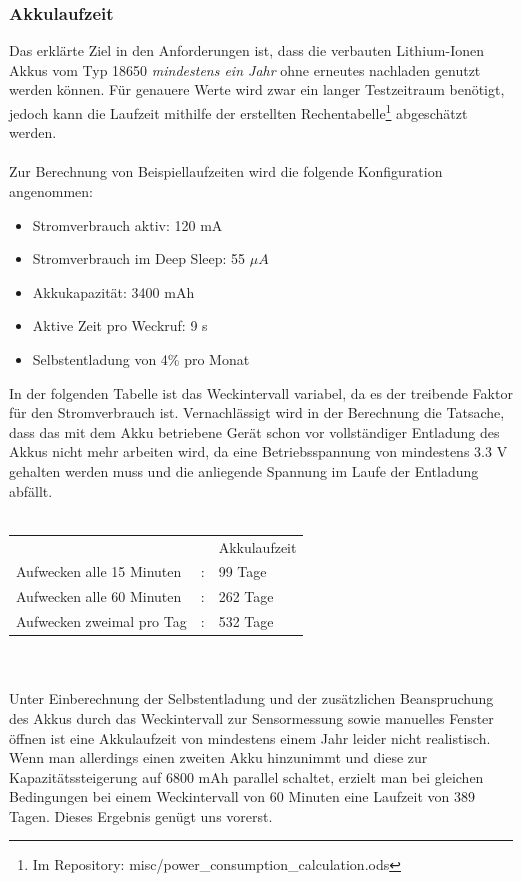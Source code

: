\documentclass[a4paper,10pt,twocolumn]{article}
\begin{document}
\subsubsection{Akkulaufzeit}
Das erklärte Ziel in den Anforderungen ist, dass die verbauten Lithium-Ionen Akkus vom Typ 18650 \textit{mindestens ein Jahr} ohne erneutes nachladen genutzt werden können. Für genauere Werte wird zwar ein langer Testzeitraum benötigt, jedoch kann die Laufzeit mithilfe der erstellten Rechentabelle\footnote{Im Repository\cite{smarthome2}: \mbox{misc/power\_consumption\_calculation.ods}} abgeschätzt werden.\\\\
Zur Berechnung von Beispiellaufzeiten wird die folgende Konfiguration angenommen:
\begin{itemize}[noitemsep]
    \item Stromverbrauch aktiv: 120 mA
    \item Stromverbrauch im Deep Sleep: 55 $\mu A$
    \item Akkukapazität: 3400 mAh
    \item Aktive Zeit pro Weckruf: 9 s
    \item Selbstentladung von 4\% pro Monat \cite[S. 20]{umweltbundesamt}
\end{itemize}
In der folgenden Tabelle ist das Weckintervall variabel, da es der treibende Faktor für den Stromverbrauch ist. Vernachlässigt wird in der Berechnung die Tatsache, dass das mit dem Akku betriebene Gerät schon vor vollständiger Entladung des Akkus nicht mehr arbeiten wird, da eine Betriebsspannung von mindestens 3.3 V gehalten werden muss und die anliegende Spannung im Laufe der Entladung abfällt.\\\\
\begin{tabularx}{\textwidth/2}{lcX}
& & Akkulaufzeit\\
Aufwecken alle 15 Minuten & : & 99 Tage\\
Aufwecken alle 60 Minuten & : & 262 Tage\\
Aufwecken zweimal pro Tag & : & 532 Tage\\
\end{tabularx}\\\\
Unter Einberechnung der Selbstentladung und der zusätzlichen Beanspruchung des Akkus durch das Weckintervall zur Sensormessung sowie manuelles Fenster öffnen ist eine Akkulaufzeit von mindestens einem Jahr leider nicht realistisch. Wenn man allerdings einen zweiten Akku hinzunimmt und diese zur Kapazitätssteigerung auf 6800 mAh parallel schaltet, erzielt man bei gleichen Bedingungen bei einem Weckintervall von 60 Minuten eine Laufzeit von 389 Tagen. Dieses Ergebnis genügt uns vorerst.
\end{document}
